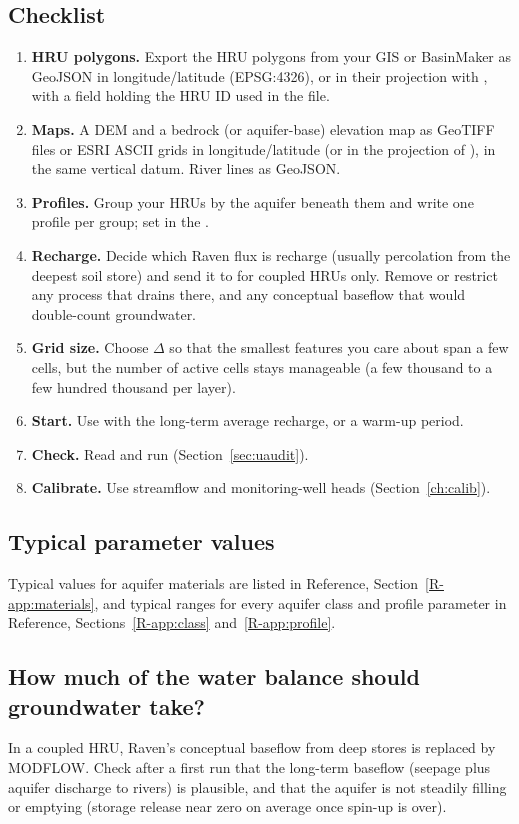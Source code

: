 \subsection{Checklist}
\begin{enumerate}
\item \textbf{HRU polygons.} Export the HRU polygons from your GIS or BasinMaker as GeoJSON in longitude/latitude
(EPSG:4326), or in their projection with , with a field holding the HRU ID used in the  file.
\item \textbf{Maps.} A DEM and a bedrock (or aquifer-base) elevation map as GeoTIFF files or ESRI ASCII grids in
longitude/latitude (or in the projection of ), in the same vertical datum. River lines as GeoJSON.
\item \textbf{Profiles.} Group your HRUs by the aquifer beneath them and write one profile per group; set
 in the .
\item \textbf{Recharge.} Decide which Raven flux is recharge (usually percolation from the deepest soil store) and send it
to  for coupled HRUs only. Remove or restrict any process that drains  there, and any
conceptual baseflow that would double-count groundwater.
\item \textbf{Grid size.} Choose $\Delta$ so that the smallest features you care about span a few cells, but the number of
active cells stays manageable (a few thousand to a few hundred thousand per layer).
\item \textbf{Start.} Use  with the long-term average recharge, or a warm-up period.
\item \textbf{Check.} Read  and run  (Section~\ref{sec:uaudit}).
\item \textbf{Calibrate.} Use streamflow and monitoring-well heads (Section~\ref{ch:calib}).
\end{enumerate}

\subsection{Typical parameter values}
Typical values for aquifer materials are listed in Reference, Section~\ref{R-app:materials}, and typical ranges for every
aquifer class and profile parameter in Reference, Sections~\ref{R-app:class} and~\ref{R-app:profile}.

\subsection{How much of the water balance should groundwater take?}
In a coupled HRU, Raven's conceptual baseflow from deep stores is replaced by MODFLOW. Check after a first run that the
long-term baseflow (seepage plus aquifer discharge to rivers) is plausible, and that the aquifer is not steadily filling or
emptying (storage release near zero on average once spin-up is over).
